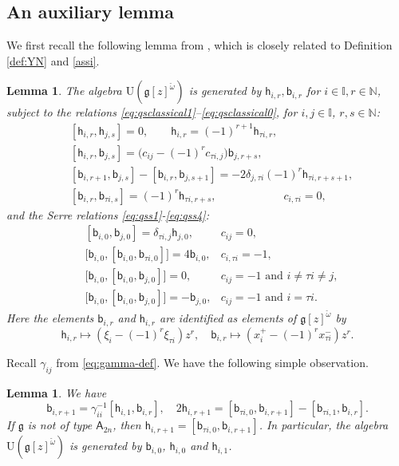 \documentclass[11pt,reqno]{amsart}
\numberwithin{equation}{section}
\newtheorem{lem}[thm]{Lemma}
\theoremstyle{definition}
\theoremstyle{remark}
\newcommand{\beq}{\begin{equation}}
\newcommand{\eeq}{\end{equation}}
\newcommand{\bN}{\mathbb{N}}
\newcommand{\sfh}{\mathsf{h}}
\newcommand{\sfb}{\mathsf{b}}
\newcommand{\g}{\mathfrak{g}}
\newcommand{\I}{{\mathbb I}}
\begin{document}
\subsection{An auxiliary lemma}
We first recall the following lemma from \cite[Proposition~2.7]{LZ24}, which is closely related to Definition \ref{def:YN} and \eqref{assi}. 
\begin{lem}\label{lem:full-gr}
The algebra $\mathrm U(\g[z]^{\check\omega})$ is generated by $\sfh_{i,r},\sfb_{i,r}$ for $i\in \I,r\in\bN$, subject to the relations \eqref{eq:qsclassical1}--\eqref{eq:qsclassical0}, for $i,j\in\I$, $r,s\in \bN$:
\begin{align}
\label{eq:qsclassical1}
&[\sfh_{i,r},\sfh_{j,s}]=0,\qquad \sfh_{i,r} =(-1)^{r+1} \sfh_{\tau i,r},
\\
\label{eq:qsclassical2}
&[\sfh_{i,r},\sfb_{j,s}]=\big(c_{ij}-(-1)^r c_{\tau i,j} \big) \sfb_{j,r+s},
\\
\label{eq:qsclassical3}
&[\sfb_{i,r+1},\sfb_{j,s}]-[\sfb_{i,r},\sfb_{j,s+1}]=-2\delta_{j,\tau i} (-1)^r \sfh_{\tau i,r+s+1}, 
\\
&[\sfb_{i,r},\sfb_{\tau i,s}]=(-1)^r \sfh_{\tau i,r+s},\qquad\qquad \qquad  c_{i,\tau i}=0,\label{eq:qsclassical0}
\end{align}
and the Serre relations \eqref{eq:qss1}-\eqref{eq:qss4}: 
\begin{align}
&[\sfb_{i,0},\sfb_{j,0}]=\delta_{\tau i, j}\sfh_{j,0}, &c_{ij}=0,\label{eq:qss1}
\\
&\big[\sfb_{i,0},[\sfb_{i,0},\sfb_{\tau i,0}]\big]  
= 4\sfb_{i,0}, &c_{i,\tau i}=-1,\label{eq:qss2}\\
&\big[\sfb_{i,0},[\sfb_{i,0},\sfb_{j,0}]\big] =0, & c_{ij}=-1 \text{ and }i\ne \tau i\ne j, \label{eq:qss3}\\
&\big[\sfb_{i,0},[\sfb_{i,0},\sfb_{j,0}]\big] =-\sfb_{j,0}, & c_{ij}=-1 \text{ and }i=\tau i.\label{eq:qss4}
\end{align}
Here the elements $\sfb_{i,r}$ and $\sfh_{i,r}$ are identified as elements of $\g[z]^{\check\omega}$ by
\beq\label{eq:hb-explicit}
\sfh_{i,r} \mapsto (\xi_i-(-1)^r\xi_{\tau i})z^{r},\quad \sfb_{i,r}\mapsto (x_i^+-(-1)^rx_{\tau i}^-)z^r.
\eeq
\end{lem}

Recall $\gamma_{ij}$ from \eqref{eq:gamma-def}. We have the following simple observation.
\begin{lem}\label{lem:gener}
We have $$\sfb_{i,r+1}=\gamma_{ii}^{-1}[\sfh_{i,1},\sfb_{i,r}],\quad 
2\sfh_{i,r+1}=[\sfb_{\tau i,0},\sfb_{i,r+1}]-[\sfb_{\tau i,1},\sfb_{i,r}].
$$
If $\g$ is not of type $\mathsf A_{2n}$, then $\sfh_{i,r+1}=[\sfb_{\tau i,0},\sfb_{i,r+1}]$. In particular, the algebra $\mathrm{U}(\g[z]^{\check\omega})$ is generated by $\sfb_{i,0}$, $\sfh_{i,0}$ and $\sfh_{i,1}$.
\end{lem}
\end{document}
